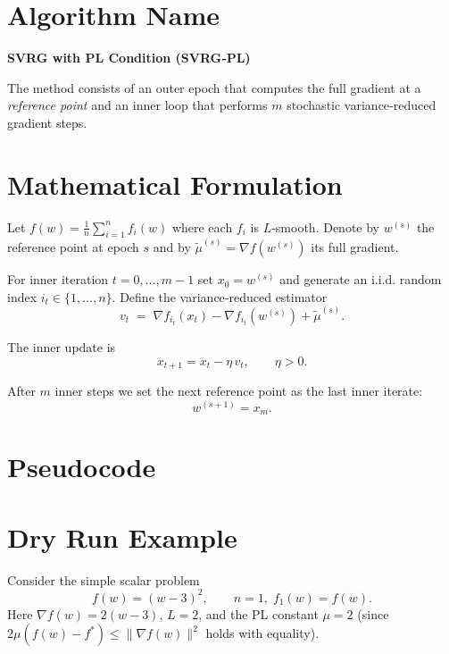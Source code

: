 \documentclass{article}
\begin{document}
\section*{Algorithm Name}
\textbf{SVRG with PL Condition (SVRG‑PL)}  

The method consists of an outer epoch that computes the full gradient at a \emph{reference point} and an inner loop that performs $m$ stochastic variance‑reduced gradient steps.

\section*{Mathematical Formulation}
Let $f(w)=\frac{1}{n}\sum_{i=1}^{n} f_i(w)$ where each $f_i$ is $L$‑smooth.  
Denote by $w^{(s)}$ the reference point at epoch $s$ and by $\tilde{\mu}^{(s)}=\nabla f(w^{(s)})$ its full gradient.  

For inner iteration $t=0,\dots,m-1$ set $x_{0}=w^{(s)}$ and generate an i.i.d. random index $i_t\in\{1,\dots,n\}$.  
Define the variance‑reduced estimator
\[
v_t \;=\; \nabla f_{i_t}(x_t)-\nabla f_{i_t}(w^{(s)})+\tilde{\mu}^{(s)} .
\]

The inner update is
\[
x_{t+1}=x_t-\eta\, v_t ,\qquad \eta>0.
\]

After $m$ inner steps we set the next reference point as the last inner iterate:
\[
w^{(s+1)} = x_m .
\]

\section*{Pseudocode}
\begin{algorithm}[H]
\caption{SVRG‑PL}
\end{algorithm}

\section*{Dry Run Example}
Consider the simple scalar problem
\[
f(w)=(w-3)^2,\qquad n=1,\; f_1(w)=f(w).
\]
Here $\nabla f(w)=2(w-3)$, $L=2$, and the PL constant $\mu=2$ (since $2\mu(f(w)-f^*)\le \|\nabla f(w)\|^2$ holds with equality).
\end{document}
